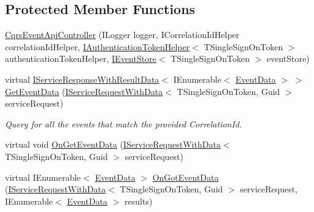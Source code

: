 \subsection*{Protected Member Functions}
\begin{DoxyCompactItemize}
\item 
\hyperlink{classCqrs_1_1WebApi_1_1CqrsEventApiController_a1ab3a601bcbce3ff1a5d935b2c2f8065_a1ab3a601bcbce3ff1a5d935b2c2f8065}{Cqrs\+Event\+Api\+Controller} (I\+Logger logger, I\+Correlation\+Id\+Helper correlation\+Id\+Helper, \hyperlink{interfaceCqrs_1_1Authentication_1_1IAuthenticationTokenHelper}{I\+Authentication\+Token\+Helper}$<$ T\+Single\+Sign\+On\+Token $>$ authentication\+Token\+Helper, \hyperlink{interfaceCqrs_1_1Events_1_1IEventStore}{I\+Event\+Store}$<$ T\+Single\+Sign\+On\+Token $>$ event\+Store)
\item 
virtual \hyperlink{interfaceCqrs_1_1Services_1_1IServiceResponseWithResultData}{I\+Service\+Response\+With\+Result\+Data}$<$ I\+Enumerable$<$ \hyperlink{classCqrs_1_1Events_1_1EventData}{Event\+Data} $>$ $>$ \hyperlink{classCqrs_1_1WebApi_1_1CqrsEventApiController_aac0079ced115761a0ab605eaebe0801b_aac0079ced115761a0ab605eaebe0801b}{Get\+Event\+Data} (\hyperlink{interfaceCqrs_1_1Services_1_1IServiceRequestWithData}{I\+Service\+Request\+With\+Data}$<$ T\+Single\+Sign\+On\+Token, Guid $>$ service\+Request)
\begin{DoxyCompactList}\small\item\em Query for all the events that match the provided Correlation\+Id. \end{DoxyCompactList}\item 
virtual void \hyperlink{classCqrs_1_1WebApi_1_1CqrsEventApiController_a705b40b973640de14f7b8b7b4c6eb1fe_a705b40b973640de14f7b8b7b4c6eb1fe}{On\+Get\+Event\+Data} (\hyperlink{interfaceCqrs_1_1Services_1_1IServiceRequestWithData}{I\+Service\+Request\+With\+Data}$<$ T\+Single\+Sign\+On\+Token, Guid $>$ service\+Request)
\item 
virtual I\+Enumerable$<$ \hyperlink{classCqrs_1_1Events_1_1EventData}{Event\+Data} $>$ \hyperlink{classCqrs_1_1WebApi_1_1CqrsEventApiController_a9f0147c846a7fd7628d199ff268d178e_a9f0147c846a7fd7628d199ff268d178e}{On\+Got\+Event\+Data} (\hyperlink{interfaceCqrs_1_1Services_1_1IServiceRequestWithData}{I\+Service\+Request\+With\+Data}$<$ T\+Single\+Sign\+On\+Token, Guid $>$ service\+Request, I\+Enumerable$<$ \hyperlink{classCqrs_1_1Events_1_1EventData}{Event\+Data} $>$ results)
\end{DoxyCompactItemize}
